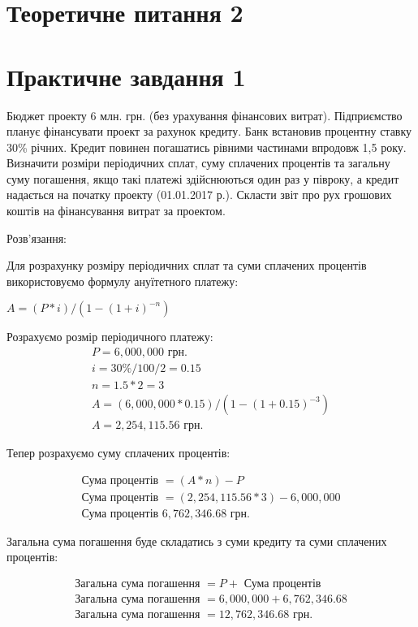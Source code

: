 \documentclass[oneside,14pt]{extarticle}
\begin{document}
\newpage
\section*{Теоретичне питання 2}

\newpage
\section*{Практичне завдання 1}

Бюджет проекту 6 млн. грн. (без урахування фінансових витрат). Підприємство планує фінансувати проект за рахунок кредиту. Банк встановив процентну ставку 30\% річних. Кредит повинен погашатись рівними частинами впродовж 1,5 року. Визначити розміри періодичних сплат, суму сплачених процентів та загальну суму погашення, якщо такі платежі здійснюються один раз у півроку, а кредит надається на початку проекту (01.01.2017 р.). Скласти звіт про рух грошових коштів на фінансування витрат за проектом.

Розв'язання:

Для розрахунку розміру періодичних сплат та суми сплачених процентів використовуємо формулу ануїтетного платежу:

$A = (P * i) / (1 - (1 + i)^{-n})$

Розрахуємо розмір періодичного платежу:
\begin{gather}
	P = 6,000,000 \text{ грн.}\nonumber\\
	i = 30\% / 100 / 2 = 0.15\nonumber\\
	n = 1.5 * 2 = 3\nonumber\\
	A = (6,000,000 * 0.15) / (1 - (1 + 0.15)^{-3})\nonumber\\
	A = 2,254,115.56 \text{ грн.}\nonumber
\end{gather}

Тепер розрахуємо суму сплачених процентів:

\begin{gather}
	\text{Сума процентів } = (A * n) - P\nonumber\\
	\text{Сума процентів } = (2,254,115.56 * 3) - 6,000,000\nonumber\\
	\text{Сума процентів }  6,762,346.68 \text{ грн.}\nonumber
\end{gather}

Загальна сума погашення буде складатись з суми кредиту та суми сплачених процентів:

\begin{gather}
	\text{Загальна сума погашення }= P + \text{ Сума процентів}\nonumber\\
	\text{Загальна сума погашення }= 6,000,000 + 6,762,346.68\nonumber\\
	\text{Загальна сума погашення }= 12,762,346.68\text{ грн.}\nonumber
\end{gather}
\end{document}
